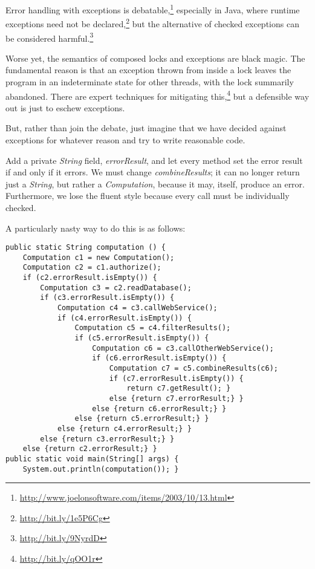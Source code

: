 \documentclass[11pt]{article}
\begin{document}
Error handling with exceptions is
debatable,\footnote{\url{http://www.joelonsoftware.com/items/2003/10/13.html}}
especially in Java, where runtime exceptions need not be
declared,\footnote{\url{http://bit.ly/1e5P6Cg}} but the alternative of checked
exceptions can be considered harmful.\footnote{\url{http://bit.ly/9NyrdD}}

Worse yet, the semantics of composed locks and exceptions are black
magic. The fundamental reason is that an exception thrown from
inside a lock leaves the program in an indeterminate state for
other threads, with the lock summarily abandoned. There are expert
techniques for mitigating this,\footnote{\url{http://bit.ly/qOO1r}} but a
defensible way out is just to eschew exceptions.

But, rather than join the debate, just imagine that we have decided
against exceptions for whatever reason and try to write reasonable
code.

Add a private \emph{String} field, \emph{errorResult}, and let every method
set the error result if and only if it errors. We must change
\emph{combineResults}; it can no longer return just a \emph{String}, but
rather a \emph{Computation}, because it may, itself, produce an error.
Furthermore, we lose the fluent style because every call must be
individually checked.

A particularly nasty way to do this is as follows:

\begin{verbatim}
public static String computation () {
    Computation c1 = new Computation();
    Computation c2 = c1.authorize();
    if (c2.errorResult.isEmpty()) {
        Computation c3 = c2.readDatabase();
        if (c3.errorResult.isEmpty()) {
            Computation c4 = c3.callWebService();
            if (c4.errorResult.isEmpty()) {
                Computation c5 = c4.filterResults();
                if (c5.errorResult.isEmpty()) {
                    Computation c6 = c3.callOtherWebService();
                    if (c6.errorResult.isEmpty()) {
                        Computation c7 = c5.combineResults(c6);
                        if (c7.errorResult.isEmpty()) {
                            return c7.getResult(); }
                        else {return c7.errorResult;} }
                    else {return c6.errorResult;} }
                else {return c5.errorResult;} }
            else {return c4.errorResult;} }
        else {return c3.errorResult;} }
    else {return c2.errorResult;} }
public static void main(String[] args) {
    System.out.println(computation()); }
\end{verbatim}
\end{document}
